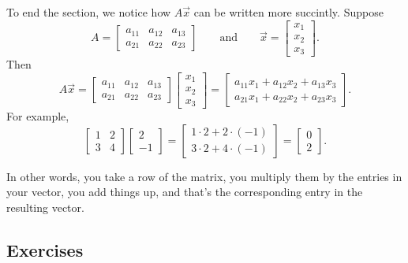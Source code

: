 To end the section, we notice how $A \vec{x}$ can be written more succintly.
Suppose
\begin{equation*}
A = 
\begin{bmatrix}
a_{11} & a_{12} & a_{13} \\
a_{21} & a_{22} & a_{23}
\end{bmatrix}
\qquad \text{and} \qquad
\vec{x} = 
\begin{bmatrix}
x_1 \\ x_2 \\ x_3 
\end{bmatrix} .
\end{equation*}
Then
\begin{equation*}
A \vec{x} = 
\begin{bmatrix}
a_{11} & a_{12} & a_{13} \\
a_{21} & a_{22} & a_{23}
\end{bmatrix}
\begin{bmatrix}
x_1 \\ x_2 \\ x_3 
\end{bmatrix} 
=
\begin{bmatrix}
a_{11} x_1 + a_{12} x_2 + a_{13} x_3 \\
a_{21} x_1 + a_{22} x_2 + a_{23} x_3
\end{bmatrix}  .
\end{equation*}
For example,
\begin{equation*}
\begin{bmatrix}
1 & 2 \\ 3 & 4
\end{bmatrix}
\begin{bmatrix}
2 \\ -1
\end{bmatrix} 
=
\begin{bmatrix}
1 \cdot 2 + 2 \cdot (-1) \\
3 \cdot 2 + 4 \cdot (-1)
\end{bmatrix}
=
\begin{bmatrix}
0 \\ 2
\end{bmatrix}  .
\end{equation*}

In other words, you take a row of the matrix, you multiply them by the
entries in your vector, you add things up, and that's the corresponding
entry in the resulting vector.


\subsection{Exercises}

